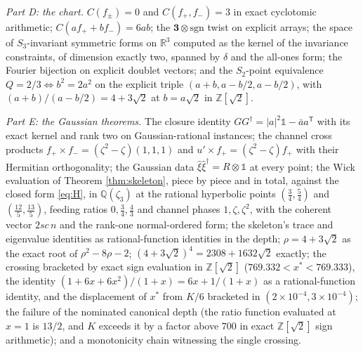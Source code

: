\documentclass[11pt]{article}
\theoremstyle{definition}
\newcommand{\R}{\mathbb{R}}
\begin{document}
\emph{Part D: the chart.} $C(f_{\pm}) = 0$ and $C(f_{+}, f_{-}) = 3$ in exact cyclotomic arithmetic; $C(af_{+} + bf_{-}) = 6ab$; the $\mathbf{3} \otimes \mathrm{sgn}$ twist on explicit arrays; the space of $S_{3}$-invariant symmetric forms on $\R^{3}$ computed as the kernel of the invariance constraints, of dimension exactly two, spanned by $\delta$ and the all-ones form; the Fourier bijection on explicit doublet vectors; and the $S_{2}$-point equivalence $Q = 2/3 \iff b^{2} = 2a^{2}$ on the explicit triple $(a+b, a-b/2, a-b/2)$, with $(a+b)/(a-b/2) = 4 + 3\sqrt{2}$ at $b = a\sqrt{2}$ in $\mathbb{Z}[\sqrt{2}]$.

\emph{Part E: the Gaussian theorems.} The closure identity $GG^{\dagger} = |a|^{2}\mathbb{1} - \bar{a}a^{\mathsf{T}}$ with its exact kernel and rank two on Gaussian-rational instances; the channel cross products $f_{+} \times f_{-} = (\zeta^{2} - \zeta)(1,1,1)$ and $u' \times f_{+} = (\zeta^{2} - \zeta)f_{+}$ with their Hermitian orthogonality; the Gaussian data $\hat\xi\hat\xi^{\dagger} = R \otimes \mathbb{1}$ at every point; the Wick evaluation of Theorem \ref{thm:skeleton}, piece by piece and in total, against the closed form \eqref{eq:H}, in $\mathbb{Q}(\zeta_{3})$ at the rational hyperbolic points $(\tfrac34, \tfrac54)$ and $(\tfrac{12}{5}, \tfrac{13}{5})$, feeding ratios $0, \tfrac34, \tfrac43$ and channel phases $1, \zeta, \zeta^{2}$, with the coherent vector $2sc\,n$ and the rank-one normal-ordered form; the skeleton's trace and eigenvalue identities as rational-function identities in the depth; $\rho = 4 + 3\sqrt{2}$ as the exact root of $\rho^{2} - 8\rho - 2$; $(4+3\sqrt{2})^{4} = 2308 + 1632\sqrt{2}$ exactly; the crossing bracketed by exact sign evaluation in $\mathbb{Z}[\sqrt{2}]$ ($769.332 < x^{*} < 769.333$), the identity $(1+6x+6x^{2})/(1+x) = 6x + 1/(1+x)$ as a rational-function identity, and the displacement of $x^{*}$ from $K/6$ bracketed in $(2 \times 10^{-4}, 3 \times 10^{-4})$; the failure of the nominated canonical depth (the ratio function evaluated at $x = 1$ is $13/2$, and $K$ exceeds it by a factor above $700$ in exact $\mathbb{Z}[\sqrt{2}]$ sign arithmetic); and a monotonicity chain witnessing the single crossing.
\end{document}
